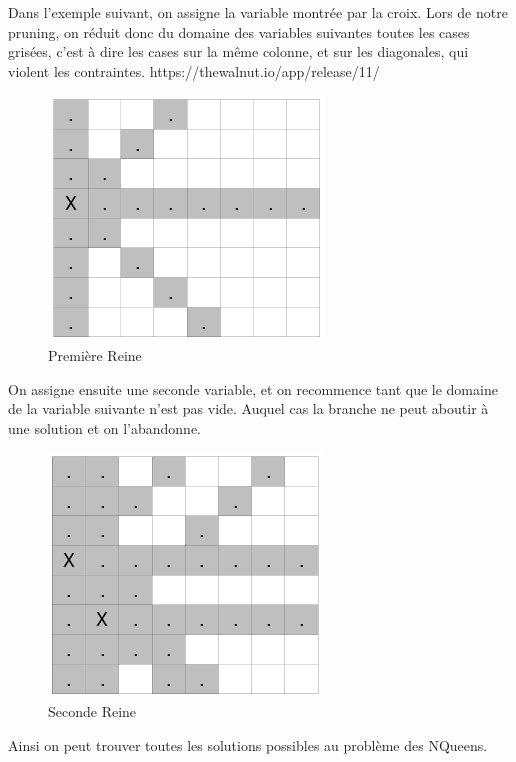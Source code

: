\documentclass{article}
\begin{document}
\clearpage

Dans l'exemple suivant, on assigne la variable montrée par la croix. Lors de notre pruning, on réduit donc du domaine des variables suivantes toutes les cases grisées, c'est à dire les cases sur la même colonne, et sur les diagonales, qui violent les contraintes. 
https://thewalnut.io/app/release/11/ 
\begin{figure}[h]
\caption{\label{reine1} Première Reine}
\begin{center}
\includegraphics[scale=0.5]{./picture/pruning1.png}
\end{center}
\end{figure}

On assigne ensuite une seconde variable, et on recommence tant que le domaine de la variable suivante n'est pas vide. Auquel cas la branche ne peut aboutir à une solution et on l'abandonne.

\begin{figure}[h]
\caption{\label{reine2} Seconde Reine}
\begin{center}
\includegraphics[scale=0.5]{./picture/pruning2.png}
\end{center}
\end{figure}

Ainsi on peut trouver toutes les solutions possibles au problème des NQueens.
\end{document}
